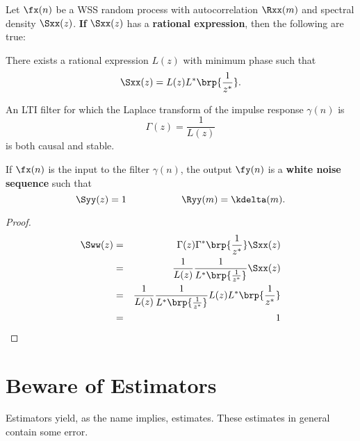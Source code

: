 \begin{theorem}
\label{thm:d-innovations}
Let $\fx(n)$ be a WSS random process with autocorrelation $\Rxx(m)$
and spectral density $\Sxx(z)$.
\textbf{If} $\Sxx(z)$ has a \textbf{rational expression},
then the following are true:

\begin{enume}
   \item There exists a rational expression $L(z)$ with minimum phase
         such that
         \[ \Sxx(z) = L(z)L^\ast\brp{\frac{1}{z^\ast}}. \]
   \item An LTI filter for which the Laplace transform of
         the impulse response $\gamma(n)$ is
         \[ \Gamma(z) = \frac{1}{L(z)} \]
         is both causal and stable.
   \item If $\fx(n)$ is the input to the filter $\gamma(n)$,
         the output $\fy(n)$ is a \textbf{white noise sequence} such that
         \[ \Syy(z)=1 \hspace{2cm} \Ryy(m)=\kdelta(m).\]
\end{enume}
\end{theorem}


\begin{proof}
\begin{eqnarray*}
   \Sww(z)
     &=& \Gamma(z)\Gamma^\ast\brp{\frac{1}{z^\ast}} \Sxx(z)
   \\&=& \frac{1}{L(z)} \frac{1}{L^\ast\brp{\frac{1}{z^\ast}}} \Sxx(z)
   \\&=& \frac{1}{L(z)} \frac{1}{L^\ast\brp{\frac{1}{z^\ast}}}
         L(z) L^\ast\brp{\frac{1}{z^\ast}}
   \\&=& 1
\end{eqnarray*}
\end{proof}



\section{Beware of Estimators}
Estimators yield, as the name implies, estimates.
These estimates in general contain some error.

